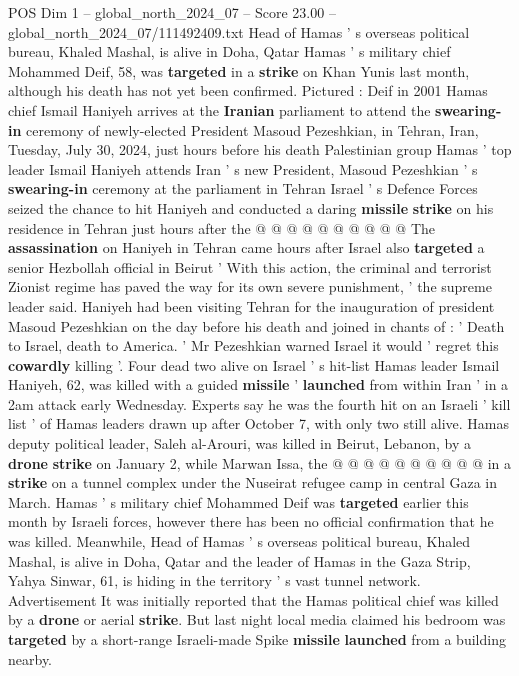 \begin{textsample}{POS Dim 1 – global\_north\_2024\_07 – Score 23.00 – global\_north\_2024\_07/111492409.txt}
Head of Hamas ' s overseas political bureau, Khaled Mashal, is alive in Doha, Qatar Hamas ' s military chief Mohammed Deif, 58, was \textbf{targeted} in a \textbf{strike} on Khan Yunis last month, although his death has not yet been confirmed.
Pictured : Deif in 2001 Hamas chief Ismail Haniyeh arrives at the \textbf{Iranian} parliament to attend the \textbf{swearing-in} ceremony of newly-elected President Masoud Pezeshkian, in Tehran, Iran, Tuesday, July 30, 2024, just hours before his death Palestinian group Hamas ' top leader Ismail Haniyeh attends Iran ' s new President, Masoud Pezeshkian ' s \textbf{swearing-in} ceremony at the parliament in Tehran Israel ' s Defence Forces seized the chance to hit Haniyeh and conducted a daring \textbf{missile} \textbf{strike} on his residence in Tehran just hours after the @ @ @ @ @ @ @ @ @ @ The \textbf{assassination} on Haniyeh in Tehran came hours after Israel also \textbf{targeted} a senior Hezbollah official in Beirut ' With this action, the criminal and terrorist Zionist regime has paved the way for its own severe punishment, ' the supreme leader said.
Haniyeh had been visiting Tehran for the inauguration of president Masoud Pezeshkian on the day before his death and joined in chants of : ' Death to Israel, death to America. ' Mr Pezeshkian warned Israel it would ' regret this \textbf{cowardly} killing '.
Four dead two alive on Israel ' s hit-list Hamas leader Ismail Haniyeh, 62, was killed with a guided \textbf{missile} ' \textbf{launched} from within Iran ' in a 2am attack early Wednesday.
Experts say he was the fourth hit on an Israeli ' kill list ' of Hamas leaders drawn up after October 7, with only two still alive.
Hamas deputy political leader, Saleh al-Arouri, was killed in Beirut, Lebanon, by a \textbf{drone} \textbf{strike} on January 2, while Marwan Issa, the @ @ @ @ @ @ @ @ @ @ in a \textbf{strike} on a tunnel complex under the Nuseirat refugee camp in central Gaza in March.
Hamas ' s military chief Mohammed Deif was \textbf{targeted} earlier this month by Israeli forces, however there has been no official confirmation that he was killed.
Meanwhile, Head of Hamas ' s overseas political bureau, Khaled Mashal, is alive in Doha, Qatar and the leader of Hamas in the Gaza Strip, Yahya Sinwar, 61, is hiding in the territory ' s vast tunnel network.
Advertisement It was initially reported that the Hamas political chief was killed by a \textbf{drone} or aerial \textbf{strike}.
But last night local media claimed his bedroom was \textbf{targeted} by a short-range Israeli-made Spike \textbf{missile} \textbf{launched} from a building nearby.

\end{textsample}

